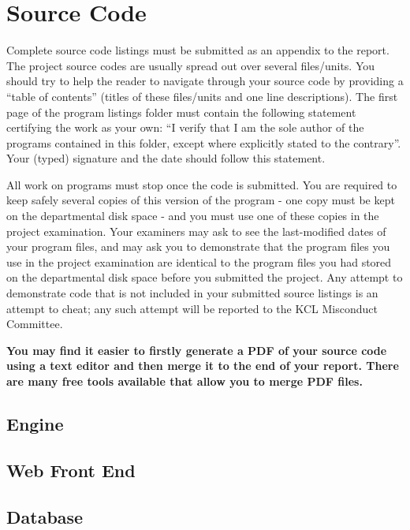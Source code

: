 \chapter{Source Code}
Complete source code listings must be submitted as an appendix to the report. The project source codes are usually spread out over several files/units. You should try to help the reader to navigate through your source code by providing a ``table of contents'' (titles of these files/units and one line descriptions). The first page of the program listings folder must contain the following statement certifying the work as your own: ``I verify that I am the sole author of the programs contained in this folder, except where explicitly stated to the contrary''. Your (typed) signature and the date should follow this statement.

All work on programs must stop once the code is submitted. You are required to keep safely several copies of this version of the program - one copy must be kept on the departmental disk space - and you must use one of these copies in the project examination. Your examiners may ask to see the last-modified dates of your program files, and may ask you to demonstrate that the program files you use in the project examination are identical to the program files you had stored on the departmental disk space before you submitted the project. Any attempt to demonstrate code that is not included in your submitted source listings is an attempt to cheat; any such attempt will be reported to the KCL Misconduct Committee.

\textbf{You may find it easier to firstly generate a PDF of your source code using a text editor and then merge it to the end of your report. There are many free tools available that allow you to merge PDF files.}


\section{Engine}


\section{Web Front End}

\section{Database}

